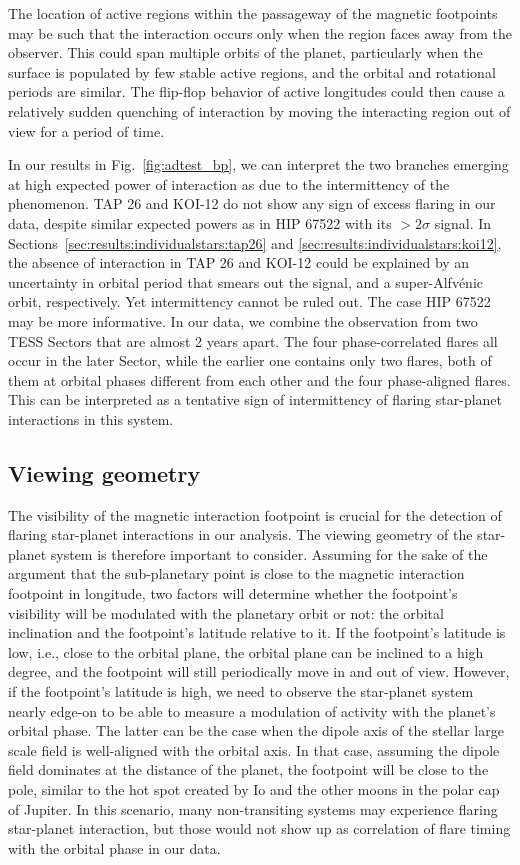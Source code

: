 \documentclass[twocolumn]{aastex631}
\begin{document}
The location of active regions within the passageway of the magnetic footpoints may be such that the interaction occurs only when the region faces away from the observer. This could span multiple orbits of the planet, particularly when the surface is populated by few stable active regions, and the orbital and rotational periods are similar. The flip-flop behavior of active longitudes could then cause a relatively sudden quenching of interaction by moving the interacting region out of view for a period of time. 

In our results in Fig.~\ref{fig:adtest_bp}, we can interpret the two branches emerging at high expected power of interaction as due to the intermittency of the phenomenon. TAP 26 and KOI-12 do not show any sign of excess flaring in our data, despite similar expected powers as in HIP 67522 with its $>2\sigma$ signal. In Sections~\ref{sec:results:individualstars:tap26} and \ref{sec:results:individualstars:koi12}, the absence of interaction in TAP 26 and KOI-12 could be explained by an uncertainty in orbital period that smears out the signal, and a super-Alfv\'enic orbit, respectively. Yet intermittency cannot be ruled out. The case HIP 67522 may be more informative. In our data, we combine the observation from two TESS Sectors that are almost 2 years apart. The four phase-correlated flares all occur in the later Sector, while the earlier one contains only two flares, both of them at orbital phases different from each other and the four phase-aligned flares. This can be interpreted as a tentative sign of intermittency of flaring star-planet interactions in this system. 

\subsection{Viewing geometry}
\label{sec:discussion:viewing}
The visibility of the magnetic interaction footpoint is crucial for the detection of flaring star-planet interactions in our analysis. The viewing geometry of the star-planet system is therefore important to consider. Assuming for the sake of the argument that the sub-planetary point is close to the magnetic interaction footpoint in longitude, two factors will determine whether the footpoint's visibility will be modulated with the planetary orbit or not: the orbital inclination and the footpoint's latitude relative to it. If the footpoint's latitude is low, i.e., close to the orbital plane, the orbital plane can be inclined to a high degree, and the footpoint will still periodically move in and out of view. However, if the footpoint's latitude is high, we need to observe the star-planet system nearly edge-on to be able to measure a modulation of activity with the planet's orbital phase. The latter can be the case when the dipole axis of the stellar large scale field is well-aligned with the orbital axis. In that case, assuming the dipole field dominates at the distance of the planet, the footpoint will be close to the pole, similar to the hot spot created by Io and the other moons in the polar cap of Jupiter. In this scenario, many non-transiting systems may experience flaring star-planet interaction, but those would not show up as correlation of flare timing with the orbital phase in our data.
\end{document}

